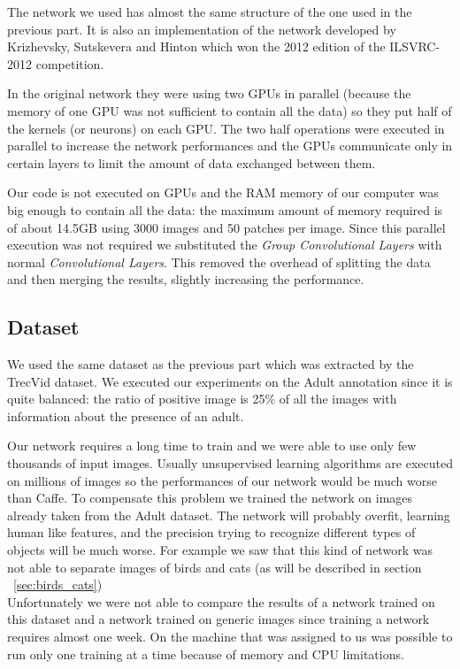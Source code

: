The network we used has almost the same structure of the one used in the previous part. It is also an implementation of the network developed by Krizhevsky, Sutskevera and Hinton which won the 2012 edition of the ILSVRC-2012 competition.

In the original network they were using two GPUs in parallel (because the memory of one GPU was not sufficient to contain all the data) so they put half of the kernels (or neurons) on each GPU. The two half operations were executed in parallel to increase the network performances and the GPUs communicate only in certain layers to limit the amount of data exchanged between them.

Our code is not executed on GPUs and the RAM memory of our computer was big enough to contain all the data: the maximum amount of memory required is of about 14.5GB using 3000 images and 50 patches per image. Since this parallel execution was not required we substituted the \textit{Group Convolutional Layers} with normal \textit{Convolutional Layers}. This removed the overhead of splitting the data and then merging the results, slightly increasing the performance.

\subsection{Dataset}

We used the same dataset as the previous part which was extracted by the TrecVid dataset. We executed our experiments on the Adult annotation since it is quite balanced: the ratio of positive image is 25\% of all the images with information about the presence of an adult.

Our network requires a long time to train and we were able to use only few thousands of input images. Usually unsupervised learning algorithms are executed on millions of images so the performances of our network would be much worse than Caffe. To compensate this problem we trained the network on images already taken from the Adult dataset. The network will probably overfit, learning human like features, and the precision trying to recognize different types of objects will be much worse. For example we saw that this kind of network was not able to separate images of birds and cats (as will be described in section ~\ref{sec:birds_cats})\\

Unfortunately we were not able to compare the results of a network trained on this dataset and a network trained on generic images since training a network requires almost one week. On the machine that was assigned to us was possible to run only one training at a time because of memory and CPU limitations.

